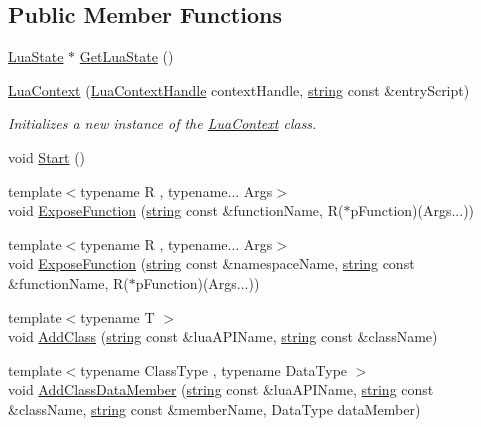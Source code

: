 \subsection*{Public Member Functions}
\begin{DoxyCompactItemize}
\item 
\hyperlink{_lua_context_8h_a805a48dbd6fa75acf2f23e35a426e325}{Lua\+State} $\ast$ \hyperlink{class_lua_context_ac807fae316c744caabd23301e79f6862}{Get\+Lua\+State} ()
\item 
\hyperlink{class_lua_context_a0cf7fa0eb9832e6c96ae9dd2aba784f8}{Lua\+Context} (\hyperlink{_lua_context_8h_a2ffcc2d3ed21165072a1d7b61259bf14}{Lua\+Context\+Handle} context\+Handle, \hyperlink{_types_8h_ad453f9f71ce1f9153fb748d6bb25e454}{string} const \&entry\+Script)
\begin{DoxyCompactList}\small\item\em Initializes a new instance of the \hyperlink{class_lua_context}{Lua\+Context} class. \end{DoxyCompactList}\item 
void \hyperlink{class_lua_context_a9a21dfe0dc89a3611eb13a7470a87acf}{Start} ()
\item 
{\footnotesize template$<$typename R , typename... Args$>$ }\\void \hyperlink{class_lua_context_a2229908b6b329ed67105f1be7409cb3f}{Expose\+Function} (\hyperlink{_types_8h_ad453f9f71ce1f9153fb748d6bb25e454}{string} const \&function\+Name, R($\ast$p\+Function)(Args...))
\item 
{\footnotesize template$<$typename R , typename... Args$>$ }\\void \hyperlink{class_lua_context_a9183ce383ddb251150c1e480d89eca21}{Expose\+Function} (\hyperlink{_types_8h_ad453f9f71ce1f9153fb748d6bb25e454}{string} const \&namespace\+Name, \hyperlink{_types_8h_ad453f9f71ce1f9153fb748d6bb25e454}{string} const \&function\+Name, R($\ast$p\+Function)(Args...))
\item 
{\footnotesize template$<$typename T $>$ }\\void \hyperlink{class_lua_context_ad80cf295f1c6e5cd94a4762ed066285d}{Add\+Class} (\hyperlink{_types_8h_ad453f9f71ce1f9153fb748d6bb25e454}{string} const \&lua\+A\+P\+I\+Name, \hyperlink{_types_8h_ad453f9f71ce1f9153fb748d6bb25e454}{string} const \&class\+Name)
\item 
{\footnotesize template$<$typename Class\+Type , typename Data\+Type $>$ }\\void \hyperlink{class_lua_context_a10c13e2c88d8e291dc39ce4b1e0d0c52}{Add\+Class\+Data\+Member} (\hyperlink{_types_8h_ad453f9f71ce1f9153fb748d6bb25e454}{string} const \&lua\+A\+P\+I\+Name, \hyperlink{_types_8h_ad453f9f71ce1f9153fb748d6bb25e454}{string} const \&class\+Name, \hyperlink{_types_8h_ad453f9f71ce1f9153fb748d6bb25e454}{string} const \&member\+Name, Data\+Type data\+Member)

\end{DoxyCompactItemize}
